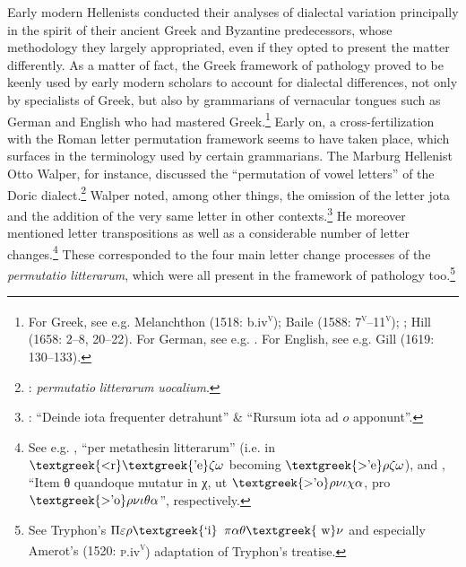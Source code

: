 \documentclass[output=paper]{langsci/langscibook}
\begin{document}
Early modern Hellenists conducted their analyses of dialectal variation principally in the spirit of their ancient Greek and Byzantine predecessors, whose methodology they largely appropriated, even if they opted to present the matter differently. As a matter of fact, the Greek framework of pathology proved to be keenly used by early modern scholars to account for dialectal differences, not only by specialists of Greek, but also by grammarians of vernacular tongues such as German and English who had mastered Greek.\footnote{ \textrm{For Greek, see e.g. Melanchthon (1518: b.iv}\textrm{\textsc{\textsuperscript{v}}}\textrm{); Baile (1588: 7}\textrm{\textsc{\textsuperscript{v}}}\textrm{–11}\textrm{\textsc{\textsuperscript{v}}}\textrm{); \citet[11]{Schmidt1604}; Hill (1658: 2–8, 20–22). For German, see e.g. \citet{Wolf1578}. For English, see e.g. Gill (1619: 130–133).}} Early on, a cross-fertilization with the Roman letter permutation framework seems to have taken place, which surfaces in the terminology used by certain grammarians. The Marburg Hellenist Otto Walper, for instance, discussed the “permutation of vowel letters” of the Doric dialect.\footnote{ \textrm{\citet[62]{Walper1589}:} \textrm{\textit{permutatio} \textit{litterarum} \textit{uocalium}}.} Walper noted, among other things, the omission of the letter jota and the addition of the very same letter in other contexts.\footnote{ \textrm{\citet[63]{Walper1589}: “Deinde iota frequenter detrahunt” \& “Rursum iota ad $o$ apponunt”.}} He moreover mentioned letter transpositions as well as a considerable number of letter changes.\footnote{ \textrm{See e.g. \citet[63]{Walper1589}, “per metathesin litterarum” (i.e. in $\text{\textgreek{<r}}\text{\textgreek{'e}}\zeta \omega $ becoming $\text{\textgreek{>'e}}\rho \zeta \omega $), and \citet[64]{Walper1589}, “Item θ quandoque mutatur in χ, ut $\text{\textgreek{>'o}}\rho \nu \iota \chi \alpha $, pro $\text{\textgreek{>'o}}\rho \nu \iota \theta \alpha $”, respectively.}} These corresponded to the four main letter change processes of the \textit{permutatio} \textit{litterarum}, which were all present in the framework of pathology too.\footnote{ \textrm{See Tryphon’s $\Pi \varepsilon \rho \text{\textgreek{`i}}$ $\pi \alpha \theta \text{\textgreek{~w}}\nu $ and especially Amerot’s (1520:} \textrm{\textsc{p.}}\textrm{iv}\textrm{\textsc{\textsuperscript{v}}}\textrm{)} \textrm{adaptation of Tryphon’s treatise.}}
\end{document}
